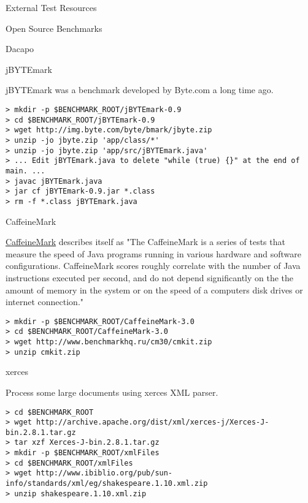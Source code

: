 \begin{section}{External Test Resources}
\begin{subsection}{Open Source Benchmarks}
\begin{subsubsection}{Dacapo}
\end{subsubsection}

\begin{subsubsection}{jBYTEmark}

jBYTEmark was a benchmark developed by Byte.com a long time ago.

\begin{lstlisting}[breaklines=true, breakatwhitespace=false]
> mkdir -p $BENCHMARK_ROOT/jBYTEmark-0.9
> cd $BENCHMARK_ROOT/jBYTEmark-0.9
> wget http://img.byte.com/byte/bmark/jbyte.zip
> unzip -jo jbyte.zip 'app/class/*'
> unzip -jo jbyte.zip 'app/src/jBYTEmark.java'
> ... Edit jBYTEmark.java to delete "while (true) {}" at the end of main. ...
> javac jBYTEmark.java
> jar cf jBYTEmark-0.9.jar *.class
> rm -f *.class jBYTEmark.java
\end{lstlisting}

\end{subsubsection}

\begin{subsubsection}{CaffeineMark}

\href{http://www.benchmarkhq.ru/cm30/info.html}{CaffeineMark} describes itself as "The CaffeineMark is a series of tests that measure the speed of Java programs running in various hardware and software configurations. CaffeineMark scores roughly correlate with the number of Java instructions executed per second, and do not depend significantly on the the amount of memory in the system or on the speed of a computers disk drives or internet connection."

\begin{lstlisting}[breaklines=true, breakatwhitespace=false]
> mkdir -p $BENCHMARK_ROOT/CaffeineMark-3.0
> cd $BENCHMARK_ROOT/CaffeineMark-3.0
> wget http://www.benchmarkhq.ru/cm30/cmkit.zip
> unzip cmkit.zip
\end{lstlisting}

\end{subsubsection}

\begin{subsubsection}{xerces}

Process some large documents using xerces XML parser.

\begin{lstlisting}[breaklines=true, breakatwhitespace=false]
> cd $BENCHMARK_ROOT
> wget http://archive.apache.org/dist/xml/xerces-j/Xerces-J-bin.2.8.1.tar.gz
> tar xzf Xerces-J-bin.2.8.1.tar.gz
> mkdir -p $BENCHMARK_ROOT/xmlFiles
> cd $BENCHMARK_ROOT/xmlFiles
> wget http://www.ibiblio.org/pub/sun-info/standards/xml/eg/shakespeare.1.10.xml.zip
> unzip shakespeare.1.10.xml.zip
\end{lstlisting}
\end{subsubsection}


\end{subsection}
\end{section}
